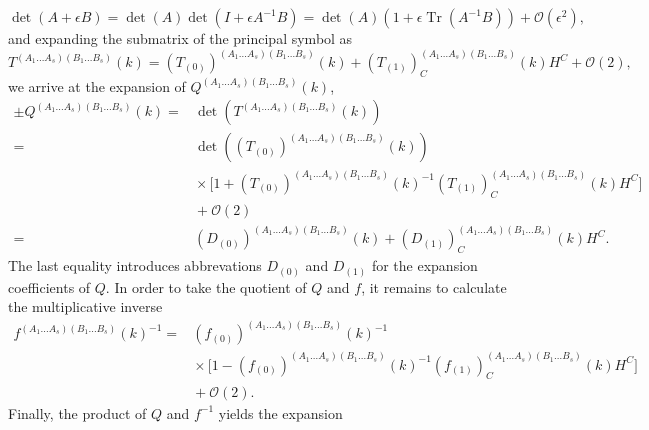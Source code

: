 \begin{equation}
  \operatorname{det}(A + \epsilon B) = \operatorname{det}(A) \operatorname{det}(I + \epsilon A^{-1} B) = \operatorname{det}(A) (1 + \epsilon \operatorname{Tr}(A^{-1} B)) + \mathcal O(\epsilon^2),
\end{equation}
and expanding the submatrix of the principal symbol as
\begin{equation}
  T^{(A_1\dots A_s)(B_1\dots B_s)}(k) = (T_{(0)})^{(A_1\dots A_s)(B_1\dots B_s)}(k) + (T_{(1)})^{(A_1\dots A_s)(B_1\dots B_s)}_C(k)H^C + \mathcal O(2),
\end{equation}
we arrive at the expansion of $Q^{(A_1\dots A_s)(B_1\dots B_s)}(k)$,
\begin{equation}\label{expansion_minor}
  \begin{aligned}
    \pm Q^{(A_1\dots A_s)(B_1\dots B_s)}(k)     = &{} \operatorname{det}(T^{(A_1\dots A_s)(B_1\dots B_s)}(k)) \\
                                            = &{} \operatorname{det}((T_{(0)})^{(A_1\dots A_s)(B_1\dots B_s)}(k)) \\
                                            &{} \times \lbrack 1 + (T_{(0)})^{(A_1\dots A_s)(B_1\dots B_s)}(k)^{-1}(T_{(1)})^{(A_1\dots A_s)(B_1\dots B_s)}_C(k)H^C\rbrack \\
                                            &{} + \mathcal O(2) \\
                                            = &{} (D_{(0)})^{(A_1\dots A_s)(B_1\dots B_s)}(k) + (D_{(1)})^{(A_1\dots A_s)(B_1\dots B_s)}_C(k) H^C.
    \end{aligned}
\end{equation}
The last equality introduces abbrevations $D_{(0)}$ and $D_{(1)}$ for the expansion coefficients of $Q$. In order to take the quotient of $Q$ and $f$, it remains to calculate the multiplicative inverse 
\begin{equation}
  \begin{aligned}
    f^{(A_1\dots A_s)(B_1\dots B_s)}(k)^{-1} = &{} (f_{(0)})^{(A_1\dots A_s)(B_1\dots B_s)}(k)^{-1} \\
                                               &{} \times \lbrack 1 - (f_{(0)})^{(A_1\dots A_s)(B_1\dots B_s)}(k)^{-1}(f_{(1)})^{(A_1\dots A_s)(B_1\dots B_s)}_C(k)H^C \rbrack \\
                                               &{} + \mathcal O(2).
  \end{aligned}
\end{equation}
Finally, the product of $Q$ and $f^{-1}$ yields the expansion
